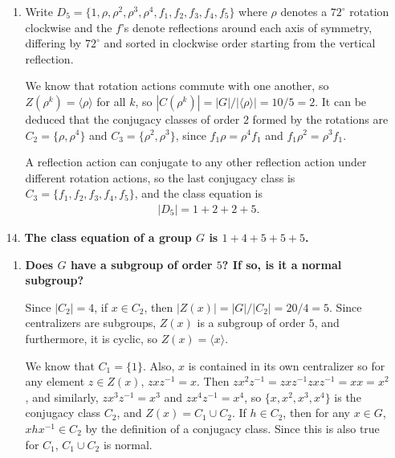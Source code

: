 \documentclass[a4paper,12pt]{article}
\begin{document}
\begin{enumerate}
\begin{enumerate}
            \item
                Write $D_5 = \{ 1, \rho, \rho^2, \rho^3, \rho^4, f_1, f_2, f_3, f_4, f_5 \}$ where $\rho$ denotes a $72^\circ$ rotation clockwise and the $f$'s denote reflections around each axis of symmetry, differing by $72^\circ$ and sorted in clockwise order starting from the vertical reflection. \par
                We know that rotation actions commute with one another, so $Z(\rho^k) = \langle \rho \rangle$ for all $k$, so $|C(\rho^k)| = |G|/|\langle \rho \rangle| = 10/5 = 2$. It can be deduced that the conjugacy classes of order $2$ formed by the rotations are $C_2 = \{ \rho, \rho^4 \}$ and $C_3 = \{ \rho^2, \rho^3 \}$, since $f_1 \rho = \rho^4 f_1$ and $f_1 \rho^2 = \rho^3 f_1$. \par
                A reflection action can conjugate to any other reflection action under different rotation actions, so the last conjugacy class is $C_3 = \{ f_1, f_2, f_3, f_4, f_5 \}$, and the class equation is
                \begin{align*}
                    |D_5| = 1 + 2 + 2 + 5.
                \end{align*}
        \end{enumerate}

    \item[14.]
        \boldmath
        \textbf{The class equation of a group $G$ is $1 + 4 + 5 + 5 + 5$.} \par
        \unboldmath
        \begin{enumerate}
            \item
                \boldmath
                \textbf{Does $G$ have a subgroup of order $5$? If so, is it a normal subgroup?} \par
                \unboldmath
                Since $|C_2| = 4$, if $x \in C_2$, then $|Z(x)| = |G|/|C_2| = 20/4 = 5$. Since centralizers are subgroups, $Z(x)$ is a subgroup of order $5$, and furthermore, it is cyclic, so $Z(x) = \langle x \rangle$.
                \iffalse
                    Also, for any $y \in C_3 \cup C_4 \cup C_5$, $|Z(y)| = 4$. Any elements in $Z(x)$ commute with more than $4$ elements, so they are not contained in $C_3 \cup C_4 \cup C_5$.
                \fi
                We know that $C_1 = \{ 1 \}$. Also, $x$ is contained in its own centralizer so for any element $z \in Z(x)$, $zxz^{-1} = x$. Then $zx^2 z^{-1} = zx z^{-1} zx z^{-1} = x x = x^2$, and similarly, $zx^3 z^{-1} = x^3$ and $zx^4 z^{-1} = x^4$, so $\{ x, x^2, x^3, x^4 \}$ is the conjugacy class $C_2$, and $Z(x) = C_1 \cup C_2$. If $h \in C_2$, then for any $x \in G$, $xhx^{-1} \in C_2$ by the definition of a conjugacy class. Since this is also true for $C_1$, $C_1 \cup C_2$ is normal.


\end{enumerate}
\end{enumerate}
\end{document}
